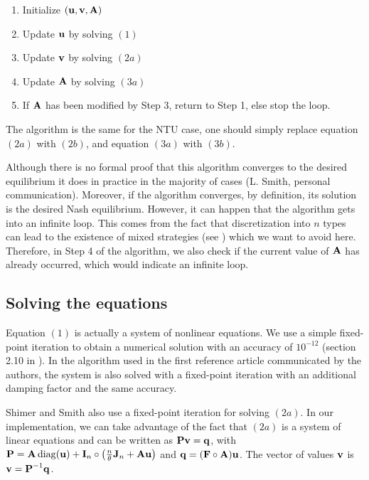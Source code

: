 \begin{enumerate}[start=0]
	\item Initialize $(\boldsymbol{\mathbf{u}},\boldsymbol{\mathbf{v}},\boldsymbol{\mathbf{A}})$
	\item Update $\boldsymbol{\mathbf{u}}$ by solving $(1)$
	\item Update $\boldsymbol{\mathbf{v}}$ by solving $(2a)$
	\item Update $\boldsymbol{\mathbf{A}}$ by solving $(3a)$
	\item If $\boldsymbol{\mathbf{A}}$ has been modified by Step 3, return to Step 1, else stop the loop.
\end{enumerate}

The algorithm is the same for the NTU case, one should simply replace equation $(2a)$ with $(2b)$, and equation $(3a)$ with $(3b)$.

Although there is no formal proof that this algorithm converges to the desired equilibrium it does in practice in the majority of cases (L. Smith, personal communication). Moreover, if the algorithm converges, by definition, its solution is the desired Nash equilibrium. However, it can happen that the algorithm gets into an infinite loop. This comes from the fact that discretization into $n$ types can lead to the existence of mixed strategies (see \citep{hagedorn_identifying_2017}) which we want to avoid here. Therefore, in Step 4 of the algorithm, we also check if the current value of $\boldsymbol{\mathbf{A}}$ has already occurred, which would indicate an infinite loop. 


\subsection*{Solving the equations}

Equation $(1)$ is actually a system of nonlinear equations. We use a simple fixed-point iteration to obtain a numerical solution with an accuracy of $10^{-12}$ (section 2.10 in \citep{atkinson_introduction_1989}). In the algorithm used in the first reference article \citep{shimer_assortative_2000} communicated by the authors, the system is also solved with a fixed-point iteration with an additional damping factor and the same accuracy.

Shimer and Smith \citep{shimer_assortative_2000} also use a fixed-point iteration for solving $(2a)$. In our implementation, we can take advantage of the fact that $(2a)$ is a system of linear equations and can be written as $\boldsymbol{\mathbf{P}} \boldsymbol{\mathbf{v}} = \boldsymbol{\mathbf{q}}$, with $\boldsymbol{\mathbf{P}} = \boldsymbol{\mathbf{A}} \operatorname{diag}(\boldsymbol{\mathbf{u}}) + \boldsymbol{\mathbf{I}}_n \circ \left(\frac{n}{\theta} \boldsymbol{\mathbf{J}}_n + \boldsymbol{\mathbf{A}} \boldsymbol{\mathbf{u}}\right)$ and $\boldsymbol{\mathbf{q}} = (\boldsymbol{\mathbf{F}} \circ \boldsymbol{\mathbf{A}}) \boldsymbol{\mathbf{u}}$. The vector of values $\boldsymbol{\mathbf{v}}$ is $ \boldsymbol{\mathbf{v}} = \boldsymbol{\mathbf{P}}^{-1} \boldsymbol{\mathbf{q}} $.

